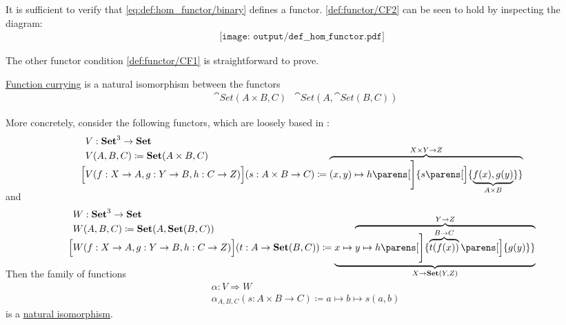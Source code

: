 \begin{defproof}
  It is sufficient to verify that \eqref{eq:def:hom_functor/binary} defines a functor. \ref{def:functor/CF2} can be seen to hold by inspecting the diagram:
  \begin{equation}\label{eq:def:hom_functor/inv_composition}
    \begin{aligned}
      \texttt{[image: output/def\_\_hom\_functor.pdf]}
    \end{aligned}
  \end{equation}

  The other functor condition \ref{def:functor/CF1} is straightforward to prove.
\end{defproof}

\begin{proposition}\label{thm:currying_is_natural_isomorphism}
  \hyperref[def:function/currying]{Function currying} is a natural isomorphism between the functors
  \begin{align*}
    &\cat{Set}(A \times B, C)
    &\cat{Set}(A, \cat{Set}(B, C))
  \end{align*}

  More concretely, consider the following functors, which are loosely based in :
  \begin{equation*}
    \begin{aligned}
      &V: \cat{Set}^3 \to \cat{Set} \\
      &V(A, B, C) \coloneqq \cat{Set}(A \times B, C) \\
      \Big[& V(f: X \to A, g: Y \to B, h: C \to Z) \Big](s: A \times B \to C) \coloneqq \smash{ \overbrace{ (x, y) \mapsto h\parens[\Bigg]{ s\parens[\Big]{ \underbrace{ f(x), g(y) }_{A \times B} } } }^{X \times Y \to Z} } \\
    \end{aligned}
  \end{equation*}
  and
  \begin{equation*}
    \begin{aligned}
      &W: \cat{Set}^3 \to \cat{Set} \\
      &W(A, B, C) \coloneqq \cat{Set}(A, \cat{Set}(B, C)) \\
      \Big[& W(f: X \to A, g: Y \to B, h: C \to Z) \Big](t: A \to \cat{Set}(B, C)) \coloneqq \smash{ \underbrace{ x \mapsto \overbrace{y \mapsto h\parens[\Bigg]{ \overbrace{t(f(x))}^{B \to C}\parens[\Big]{ g(y) } } }^{Y \to Z} }_{X \to \cat{Set}(Y, Z)} } \\
    \end{aligned}
  \end{equation*}

  Then the family of functions
  \begin{equation*}
    \begin{aligned}
      &\alpha: V \Rightarrow W \\
      &\alpha_{A,B,C}(s: A \times B \to C) \coloneqq a \mapsto b \mapsto s(a, b)
    \end{aligned}
  \end{equation*}
  is a \hyperref[thm:natural_isomorphism]{natural isomorphism}.
\end{proposition}
